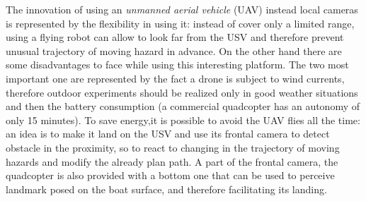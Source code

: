 \documentclass[12pt]{article}
\begin{document}
      The innovation of using an \textit{unmanned aerial vehicle} (UAV) instead local cameras is represented by the flexibility in using it: instead of cover only a limited range, using a flying robot can allow to look far from the USV and therefore prevent unusual trajectory of moving hazard in advance. On the other hand there are some disadvantages to face while using this interesting platform. The two most important one are represented by the fact a drone is subject to wind currents, therefore outdoor experiments should be realized only in good weather situations and then the battery consumption (a commercial quadcopter has an autonomy of only 15 minutes).
      To save energy,it is possible to avoid the UAV flies all the time: an idea is to make it land on the USV and use its frontal camera to detect obstacle in the proximity, so to react to changing in the trajectory of moving hazards and modify the already plan path.
      A part of the frontal camera, the quadcopter is also provided with a bottom one that can be used to perceive landmark posed on the boat surface, and therefore facilitating its landing.

%
%
\printbibliography



\end{document}

